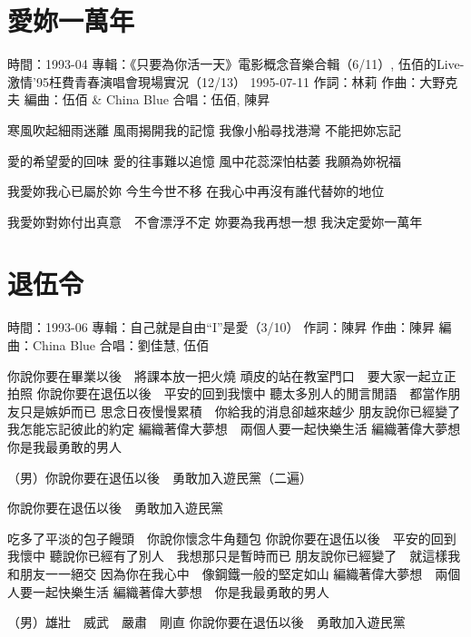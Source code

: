 \documentclass[UTF8,a4paper,oneside,twocolumn,12pt]{ctexbook}
\newcommand{\infopair}[2]{\textbullet #1：#2}
\newcommand{\zc}[1][伍佰]{\infopair{作詞}{#1}}
\newcommand{\zq}[1][伍佰]{\infopair{作曲}{#1}}
\newcommand{\bq}[1][伍佰]{\infopair{編曲}{#1}}
\newcommand{\zj}[1]{\infopair{專輯}{#1}}
\newcommand{\sj}[1]{\infopair{時間}{#1}}
\newenvironment{info}{\begin{flushleft}\kaishu
	}
	{\end{flushleft}\normalsize\yahei\par}
\newenvironment{lyric}{
	}
{}
\begin{document}
\section{愛妳一萬年}
\begin{info}
	\sj{1993-04}
	\zj{《只要為你活一天》電影概念音樂合輯（6/11）, 伍佰的Live-激情'95枉費青春演唱會現場實況（12/13） 1995-07-11}
	\zc[林莉]
	\zq[大野克夫]
	\bq[伍佰 \& China Blue]
	\infopair{合唱}{伍佰, 陳昇}
\end{info}
\begin{lyric}%
	寒風吹起細雨迷離 風雨揭開我的記憶
	我像小船尋找港灣 不能把妳忘記

	愛的希望愛的回味 愛的往事難以追憶
	風中花蕊深怕枯萎 我願為妳祝福

	我愛妳我心已屬於妳 今生今世不移
	在我心中再沒有誰代替妳的地位

	我愛妳對妳付出真意　不會漂浮不定
	妳要為我再想一想 我決定愛妳一萬年
\end{lyric}

\section{退伍令}%
\begin{info}
	\sj{1993-06}%
	\zj{自己就是自由``I''是愛（3/10）}
	\zc[陳昇]
	\zq[陳昇]
	\bq[China Blue]
	\infopair{合唱}{劉佳慧, 伍佰}
\end{info}
\begin{lyric}%
	你說你要在畢業以後　將課本放一把火燒
	頑皮的站在教室門口　要大家一起立正拍照
	你說你要在退伍以後　平安的回到我懷中
	聽太多別人的閒言閒語　都當作朋友只是嫉妒而已
	思念日夜慢慢累積　你給我的消息卻越來越少
	朋友說你已經變了　我怎能忘記彼此的約定
	編織著偉大夢想　兩個人要一起快樂生活
	編織著偉大夢想　你是我最勇敢的男人

	（男）你說你要在退伍以後　勇敢加入遊民黨（二遍）

	你說你要在退伍以後　勇敢加入遊民黨

	吃多了平淡的包子饅頭　你說你懷念牛角麵包
	你說你要在退伍以後　平安的回到我懷中
	聽說你已經有了別人　我想那只是暫時而已
	朋友說你已經變了　就這樣我和朋友一一絕交
	因為你在我心中　像鋼鐵一般的堅定如山
	編織著偉大夢想　兩個人要一起快樂生活
	編織著偉大夢想　你是我最勇敢的男人

	（男）雄壯　威武　嚴肅　剛直
	你說你要在退伍以後　勇敢加入遊民黨
\end{lyric}
\end{document}
